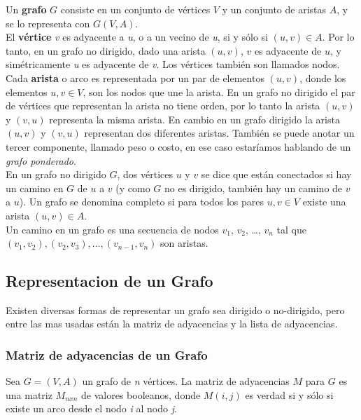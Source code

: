       Un \textbf{grafo} $G$ consiste en un conjunto de vértices $V$ y un conjunto de aristas $A$, y se lo representa con $G(V,A)$.\\

      El \textbf{vértice} \emph{v} es adyacente a \emph{u}, o a un vecino de \emph{u}, si y sólo si $(u,v) \in A$. Por lo tanto, en un grafo no dirigido, dado una arista $(u,v)$, $v$ es adyacente de $u$, y simétricamente \emph{u} es adyacente de \emph{v}.
      Los vértices también son llamados nodos. \\

      Cada \textbf{arista} o arco es representada por un par de elementos $(u,v)$, donde los elementos $u,v \in V$, son los nodos que une la arista.
      En un grafo no dirigido el par de vértices que representan la arista no tiene orden, por lo tanto la arista $(u,v)$ y $(v,u)$ representa la misma arista. En cambio en un grafo dirigido la arista $(u,v)$ y $(v,u)$ representan dos diferentes aristas. También se puede anotar un tercer componente, llamado peso o costo, en ese caso estaríamos hablando de un \emph{grafo ponderado}.\\

      En un grafo no dirigido $G$, dos vértices $u$ y $v$ se dice que están conectados si hay un camino en $G$ de $u$ a $v$ (y como $G$ no es dirigido, también hay un camino de $v$ a $u$). Un grafo  se denomina completo si para todos los pares $u,v \in V$ existe una arista $(u,v) \in A$.\\

      Un camino en un grafo es una secuencia de nodos $v_{1}$, $v_{2}$, \ldots{}, $v_n$ tal que $(v_{1}, v_{2}), (v_{2}, v_{3}), \ldots{}, (v_{n-1}, v_n)$ son aristas.
    \subsection{Representacion de un Grafo} %
    \label{sub:representacion_de_un_grafo}
      Existen diversas formas de representar un grafo sea dirigido o no-dirigido, pero entre las mas usadas están la matriz de adyacencias y la lista de adyacencias.
      \subsubsection{Matriz de adyacencias de un Grafo} %
      \label{ssub:matriz_de_adyacencias_de_un_grafo}
        Sea $G = (V,A)$ un grafo de \emph{n} vértices. La matriz de adyacencias $M$  para $G$ es una matriz $M_{nxn}$ de valores booleanos, donde $M(i,j)$ es verdad si y sólo si existe un arco desde el nodo \emph{i} al nodo \emph{j}.

